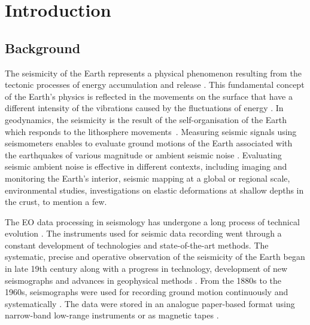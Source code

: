 \documentclass[sensors,article,accept,moreauthors,pdftex]{Definitions/mdpi}
\begin{document}

\section{Introduction}

\subsection{Background}
The seismicity of the Earth represents a physical phenomenon resulting from the tectonic processes of energy accumulation and release \cite{GutenbergRichter}. This fundamental concept of the Earth's physics is reflected in the movements on the surface that have {a }different intensity of the vibrations{ }caused by the fluctuations of energy \cite{Shearer2019}. In geodynamics, the seismicity is the result of {the }self-organisation of the Earth {which responds }to the lithosphere \mbox{movements \cite{UdiasBuforn2017}}. Measuring seismic signals using seismometers enables to evaluate ground motions of the Earth{ }associated with the earthquakes of various magnitude or ambient seismic noise \cite{nakata_gualtieri_fichtner_2019}. Evaluating seismic ambient noise is effective in different contexts{, including }imaging and monitoring the Earth’s interior, seismic mapping {at a }global {or} regional scale{, }environmental studies, {investigations on }elastic deformations {at shallow depths in the crust, } to mention a few.

{The } {EO} data processing {in seismology }has undergone a long process of technical evolution \cite{DeweyByerly1979,Agnew}. The instruments used for seismic data recording went through a constant development of technologies and state-of-the-art methods. The systematic, precise and operative observation of the seismicity of the Earth began in late {19}th century along with a progress in technology, development of new seismographs and { }advances in geophysical methods \cite{SchweitzerLee2003}. From the 1880s{ to the 1960s, seismographs were used for }recording ground motion continuously and systematically \cite{SchweitzerLee2003}{. The data were stored in an }analogue paper-based format using{ }narrow-band low-range instruments{ }\cite{Batlloetal2008,Wangetal2014}{ }or as magnetic tapes \cite{Anetal2015}. 
\end{document}
